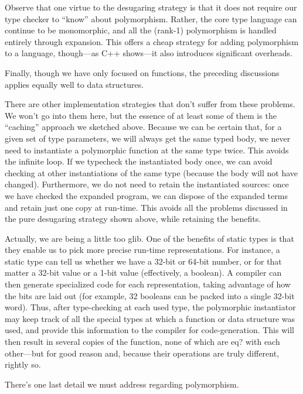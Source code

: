Observe that one virtue to the desugaring strategy is that it does not require
our type checker to “know” about polymorphism. Rather, the core type language
can continue to be monomorphic, and all the (rank-1) polymorphism is handled
entirely through expansion. This offers a cheap strategy for adding polymorphism
to a language, though—as C++ shows—it also introduces significant overheads.

Finally, though we have only focused on functions, the preceding discussions
applies equally well to data structures.


There are other implementation strategies that don’t suffer from these problems.
We won’t go into them here, but the essence of at least some of them is the
“caching” approach we sketched above. Because we can be certain that, for a
given set of type parameters, we will always get the same typed body, we never
need to instantiate a polymorphic function at the same type twice. This avoids
the infinite loop. If we typecheck the instantiated body once, we can avoid
checking at other instantiations of the same type (because the body will not
have changed). Furthermore, we do not need to retain the instantiated sources:
once we have checked the expanded program, we can dispose of the expanded terms
and retain just one copy at run-time. This avoids all the problems discussed in
the pure desugaring strategy shown above, while retaining the benefits.

Actually, we are being a little too glib. One of the benefits of static types is
that they enable us to pick more precise run-time representations. For instance,
a static type can tell us whether we have a 32-bit or 64-bit number, or for that
matter a 32-bit value or a 1-bit value (effectively, a boolean). A compiler can
then generate specialized code for each representation, taking advantage of how
the bits are laid out (for example, 32 booleans can be packed into a single
32-bit word). Thus, after type-checking at each used type, the polymorphic
instantiator may keep track of all the special types at which a function or data
structure was used, and provide this information to the compiler for
code-generation. This will then result in several copies of the function, none
of which are eq? with each other—but for good reason and, because their
operations are truly different, rightly so.


There’s one last detail we must address regarding polymorphism.


